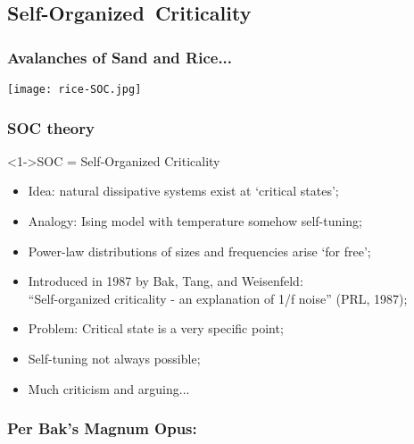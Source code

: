


\subsection{Self-Organized\ Criticality}

\begin{frame}
  
  \frametitle{Avalanches of Sand and Rice...}

  \begin{center}
    \texttt{[image: rice-SOC.jpg]}
  \end{center}

\end{frame}

\begin{frame}
  \frametitle{SOC theory}

  \begin{block}<1->{SOC = Self-Organized Criticality}
    \begin{itemize}
    \item<1-> Idea: natural dissipative systems exist at `critical states';
    \item<2-> Analogy: Ising model with temperature somehow self-tuning;
    \item<3-> Power-law distributions of sizes and frequencies arise `for free';
    \item<4-> Introduced in 1987 by Bak, Tang, and Weisenfeld\cite{bak1987a,bak1997a,jensen1998a}:\\
      ``Self-organized criticality - an explanation of 1/f noise'' (PRL, 1987);
    \item<5-> \alert{Problem:} Critical state is a very specific point;
    \item<6-> Self-tuning not always possible;
    \item<7-> Much criticism and arguing...
    \end{itemize}
  \end{block}

\end{frame}


\begin{frame}
  \frametitle{Per Bak's Magnum Opus:}


\end{frame}


